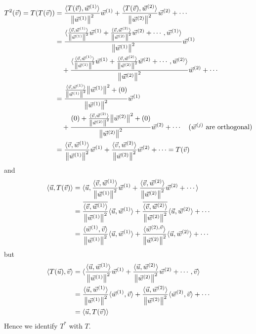 \begin{align*}
T^2(\vec{v}) = T(T(\vec{v})) &= \frac{\langle T(\vec{v}), \vec{w}^{(1)}\rangle}{\norm{\vec{w}^{(1)}}^2} \vec{w}^{(1)} + \frac{\langle T(\vec{v}), \vec{w}^{(2)}\rangle}{\norm{\vec{w}^{(2)}}^2} \vec{w}^{(2)} + \cdots \\
&= \frac{\langle \frac{\langle \vec{v}, \vec{w}^{(1)}\rangle}{\norm{\vec{w}^{(1)}}^2} \vec{w}^{(1)} + \frac{\langle \vec{v}, \vec{w}^{(2)}\rangle}{\norm{\vec{w}^{(2)}}^2} \vec{w}^{(2)} + \cdots, \vec{w}^{(1)}\rangle}{\norm{\vec{w}^{(1)}}^2} \vec{w}^{(1)} \\
&\quad+ \frac{\langle \frac{\langle \vec{v}, \vec{w}^{(1)}\rangle}{\norm{\vec{w}^{(1)}}^2} \vec{w}^{(1)} + \frac{\langle \vec{v}, \vec{w}^{(2)}\rangle}{\norm{\vec{w}^{(2)}}^2} \vec{w}^{(2)} + \cdots, \vec{w}^{(2)}\rangle}{\norm{\vec{w}^{(2)}}^2} \vec{w}^{(2)} + \cdots \\
&= \frac{\frac{\langle \vec{v}, \vec{w}^{(1)}\rangle}{\norm{\vec{w}^{(1)}}^2} \norm{\vec{w}^{(1)}}^2 + (0)}{\norm{\vec{w}^{(1)}}^2} \vec{w}^{(1)} \\
&\quad+ \frac{(0) + \frac{\langle \vec{v}, \vec{w}^{(2)}\rangle}{\norm{\vec{w}^{(2)}}^2} \norm{\vec{w}^{(2)}}^2 + (0)}{\norm{\vec{w}^{(2)}}^2} \vec{w}^{(2)} + \cdots \quad \text{($\vec{w}^{(j)}$ are orthogonal)} \\
&= \frac{\langle \vec{v}, \vec{w}^{(1)}\rangle}{\norm{\vec{w}^{(1)}}^2} \vec{w}^{(1)} + \frac{\langle \vec{v}, \vec{w}^{(2)}\rangle}{\norm{\vec{w}^{(2)}}^2} \vec{w}^{(2)} + \cdots = T(\vec{v})
\end{align*}
and
\begin{align*}
\langle \vec{u}, T(\vec{v}) \rangle &= \langle \vec{u}, \frac{\langle \vec{v}, \vec{w}^{(1)}\rangle}{\norm{\vec{w}^{(1)}}^2} \vec{w}^{(1)} + \frac{\langle \vec{v}, \vec{w}^{(2)}\rangle}{\norm{\vec{w}^{(2)}}^2} \vec{w}^{(2)} + \cdots \rangle \\
&= \frac{\overline{\langle \vec{v}, \vec{w}^{(1)}\rangle}}{\norm{\vec{w}^{(1)}}^2} \langle \vec{u}, \vec{w}^{(1)} \rangle + \frac{\overline{\langle \vec{v}, \vec{w}^{(2)}\rangle}}{\norm{\vec{w}^{(2)}}^2} \langle \vec{u}, \vec{w}^{(2)} \rangle + \cdots \\
&= \frac{\langle \vec{w}^{(1)}, \vec{v} \rangle}{\norm{\vec{w}^{(1)}}^2} \langle \vec{u}, \vec{w}^{(1)} \rangle + \frac{\langle \vec{w}^{(2), \vec{v}}\rangle}{\norm{\vec{w}^{(2)}}^2} \langle \vec{u}, \vec{w}^{(2)} \rangle + \cdots 
\end{align*}
but
\begin{align*}
\langle T(\vec{u}), \vec{v} \rangle &= \langle \frac{\langle \vec{u}, \vec{w}^{(1)}\rangle}{\norm{\vec{w}^{(1)}}^2} \vec{w}^{(1)} + \frac{\langle \vec{u}, \vec{w}^{(2)}\rangle}{\norm{\vec{w}^{(2)}}^2} \vec{w}^{(2)} + \cdots, \vec{v} \rangle \\
&= \frac{\langle \vec{u}, \vec{w}^{(1)}\rangle}{\norm{\vec{w}^{(1)}}^2} \langle \vec{w}^{(1)}, \vec{v} \rangle + \frac{\langle \vec{u}, \vec{w}^{(2)}\rangle}{\norm{\vec{w}^{(2)}}^2} \langle \vec{w}^{(2)}, \vec{v} \rangle + \cdots \\
&= \langle \vec{u}, T(\vec{v}) \rangle
\end{align*}
Hence we identify $T^*$ with $T$.

